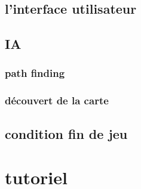 \documentclass[a4paper 12pts]{article}
\begin{document}
 
\subsection{l'interface utilisateur}

\subsection{IA}

\subsubsection{path finding}

\subsubsection{découvert de la carte}

\subsection{condition fin de jeu}


















\section{tutoriel}
\end{document}
